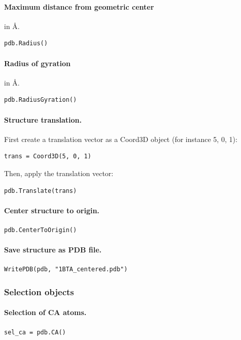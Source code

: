 \documentclass[12pt,a4paper]{article}
\begin{document}
\paragraph{Maximum distance from geometric center} in \AA.
\begin{verbatim}
pdb.Radius()
\end{verbatim}


\paragraph{Radius of gyration} in \AA.
\begin{verbatim}
pdb.RadiusGyration()
\end{verbatim}


\paragraph{Structure translation.}
First create a translation vector as a Coord3D object (for instance 5, 0, 1):
\begin{verbatim}
trans = Coord3D(5, 0, 1)
\end{verbatim}
Then, apply the translation vector:
\begin{verbatim}
pdb.Translate(trans)
\end{verbatim}


\paragraph{Center structure to origin.}
\begin{verbatim}
pdb.CenterToOrigin()
\end{verbatim}


\paragraph{Save structure as PDB file.}
\begin{verbatim}
WritePDB(pdb, "1BTA_centered.pdb")
\end{verbatim}


\subsubsection{Selection objects}

\paragraph{Selection of CA atoms.}
\begin{verbatim}
sel_ca = pdb.CA()
\end{verbatim}
\end{document}
